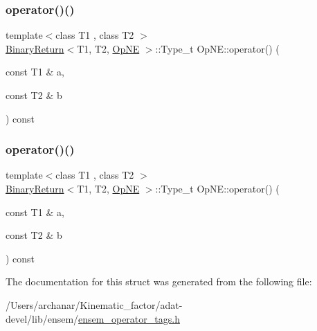 \mbox{\label{structOpNE_ae32186e8a2a30c388bbe8af0eea8e4c2}} 
\subsubsection{\texorpdfstring{operator()()}{operator()()}\hspace{0.1cm}{\footnotesize\ttfamily [2/3]}}
{\footnotesize\ttfamily template$<$class T1 , class T2 $>$ \\
\mbox{\hyperlink{structBinaryReturn}{Binary\+Return}}$<$T1, T2, \mbox{\hyperlink{structOpNE}{Op\+NE}} $>$\+::Type\+\_\+t Op\+N\+E\+::operator() (\begin{DoxyParamCaption}\item[{const T1 \&}]{a,  }\item[{const T2 \&}]{b }\end{DoxyParamCaption}) const\hspace{0.3cm}{\ttfamily [inline]}}

\mbox{\label{structOpNE_ae32186e8a2a30c388bbe8af0eea8e4c2}} 
\subsubsection{\texorpdfstring{operator()()}{operator()()}\hspace{0.1cm}{\footnotesize\ttfamily [3/3]}}
{\footnotesize\ttfamily template$<$class T1 , class T2 $>$ \\
\mbox{\hyperlink{structBinaryReturn}{Binary\+Return}}$<$T1, T2, \mbox{\hyperlink{structOpNE}{Op\+NE}} $>$\+::Type\+\_\+t Op\+N\+E\+::operator() (\begin{DoxyParamCaption}\item[{const T1 \&}]{a,  }\item[{const T2 \&}]{b }\end{DoxyParamCaption}) const\hspace{0.3cm}{\ttfamily [inline]}}



The documentation for this struct was generated from the following file\+:\begin{DoxyCompactItemize}
\item 
/\+Users/archanar/\+Kinematic\+\_\+factor/adat-\/devel/lib/ensem/\mbox{\hyperlink{adat-devel_2lib_2ensem_2ensem__operator__tags_8h}{ensem\+\_\+operator\+\_\+tags.\+h}}\end{DoxyCompactItemize}
